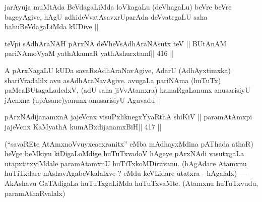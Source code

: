 \begin{artha}
jarAyuja muMtAda BeVdagaLiMda loVkagaLu (deVhagaLu) beVre beVre bageyAgive, hAgU adhideVvatAsavxrUparAda deVvategaLU saha bahuBeVdagaLiMda kUDive ||
\end{artha}


\begin{shl}
teV\s pi sAdhAraNAH pArxNA deVheV\s sAdhAraNAsutx teV ||
BUtAnAM pariNAmoV\s yaM \footnotemark[2]yathAkamaR \footnotemark[3]yathAshurxtamf\hfill || 416 ||
\end{shl}

\begin{artha}
A pArxNagaLU kUDa savaRsAdhAraNavAgive, AdarU (AdhAyxtimxka) shariVradalilx avu asAdhAraNavAgive. avugaLa pariNAma (huTuTx) paMcaBUtagaLadedxV, (adU saha jiVvAtamxra) kamaRgaLanunx anusarisiyU jAcnxna (upAsane)yanunx anusarisiyU Aguvadu ||
\end{artha}

\begin{shl}
pArxNAdijanamxnA jajeVcnx visuPxliknegxYyaRthA shiKiV ||
paramAtAmx\s pi jajeVcnx KaM\footnotemark[4] yathA kumABxdijanamxBiH\hfill || 417 ||
\end{shl}

\begin{artha}
(``savaREte AtAmxnoVvuyxcacxranitx'' eMba mAdhayxMdina pAThada athaR) heVge beMkiyu kiDigaLoMdige huTuTxvadoV hAgeye pArxNAdi vasutxgaLa utapxtitxyiMdale paramAtamxnU huTiTxkoMDiruvanu. (hAgAdare Atamxnu huTiTxdare nAshavAgabeVkalalxve ? eMdu keVLidare utatxra - hAgalalx) --- AkAshavu GaTAdigaLa huTuTxgaLiMda huTuTxvaMte. (Atamxnu huTuTxvudu, paramAthaRvalalx)
\end{artha}

